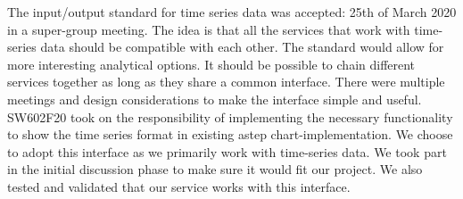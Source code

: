 \FloatBarrier
{}
The input/output standard for time series data was accepted: 25th of March 2020 in a super-group meeting. The idea is that all the services that work with time-series data should be compatible with each other. The standard would allow for more interesting analytical options. It should be possible to chain different services together as long as they share a common interface. There were multiple meetings and design considerations to make the interface simple and useful.
SW602F20 took on the responsibility of implementing the necessary functionality to show the time series format in existing \gls{astep} chart-implementation. We choose to adopt this interface as we primarily work with time-series data. We took part in the initial discussion phase to make sure it would fit our project. We also tested and validated that our service works with this interface.
